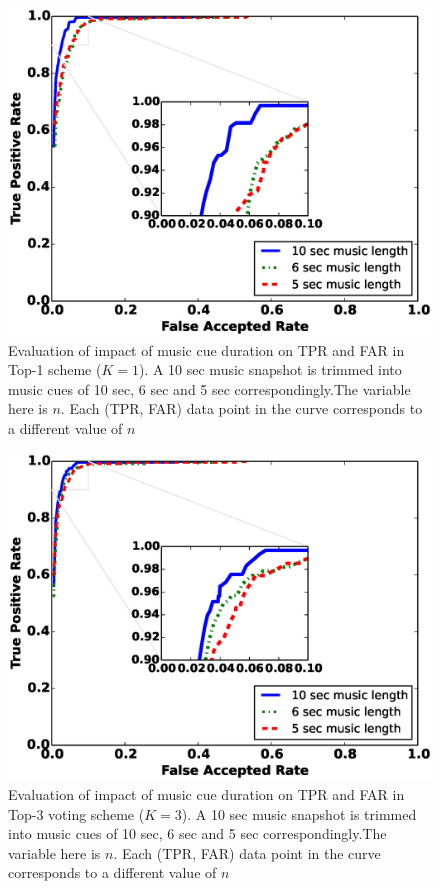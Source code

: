 \begin{figure}[t]
\centering
\includegraphics [width=\columnwidth]{figure/top1_roc.eps}
\caption{Evaluation of impact of music cue duration on TPR and FAR in Top-1 
scheme ($K = 1$). A 10 sec music snapshot is trimmed into music cues of 10 
sec, 6 sec and 5 sec correspondingly.The variable here is $n$. Each (TPR, FAR) data point in the curve corresponds to a different value of $n$}
\label{fig:roc-top1}
\end{figure}

\begin{figure}[t]
\centering
\includegraphics [width=\columnwidth]{figure/top3_roc.eps}
\caption{Evaluation of impact of music cue duration on TPR and FAR in Top-3 
voting scheme ($K = 3$). A 10 sec music snapshot is trimmed into music cues of 
10 sec, 6 sec and 5 sec correspondingly.The variable here is $n$. Each (TPR, FAR) data point in the curve corresponds to a different value of $n$}
\label{fig:roc-top3}
\end{figure}

